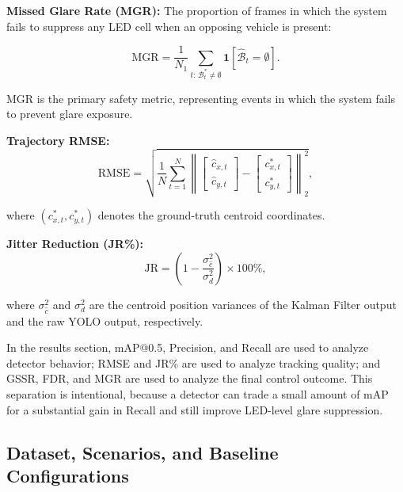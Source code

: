 \documentclass[pdflatex,sn-mathphys-num]{sn-jnl}%
\theoremstyle{thmstyleone}%
\theoremstyle{thmstyletwo}%
\theoremstyle{thmstylethree}%
\begin{document}
\medskip
\noindent\textbf{Missed Glare Rate (MGR):}
The proportion of frames in which the system fails to suppress any LED
cell when an opposing vehicle is present:

\begin{equation}
\mathrm{MGR} = \frac{1}{N_1}
\sum_{t:\, \mathcal{B}^{*}_t \neq \emptyset}
\mathbf{1}\!\left[\hat{\mathcal{B}}_t = \emptyset\right].
\label{eq:mgr}
\end{equation}

MGR is the primary safety metric, representing events in which the
system fails to prevent glare exposure.

\medskip
\noindent\textbf{Trajectory RMSE:}
\begin{equation}
\mathrm{RMSE} = \sqrt{
  \frac{1}{N} \sum_{t=1}^{N}
  \left\|
    \begin{bmatrix}\hat{c}_{x,t} \\ \hat{c}_{y,t}\end{bmatrix}
    -
    \begin{bmatrix}c^{*}_{x,t} \\ c^{*}_{y,t}\end{bmatrix}
  \right\|_2^2
},
\label{eq:rmse}
\end{equation}

\noindent where $(c^{*}_{x,t}, c^{*}_{y,t})$ denotes the
ground-truth centroid coordinates. ~\cite{Bishop2006}

\medskip
\noindent\textbf{Jitter Reduction (JR\%):}
\begin{equation}
\mathrm{JR} = \left(1 -
  \frac{\sigma_{\hat{c}}^2}{\sigma_{d}^2}
\right) \times 100\%,
\label{eq:jitter}
\end{equation}

\noindent where $\sigma_{\hat{c}}^2$ and $\sigma_{d}^2$ are the
centroid position variances of the Kalman Filter output and the raw
YOLO output, respectively.

\medskip
In the results section, mAP@0.5, Precision, and Recall are used to
analyze detector behavior; RMSE and JR\% are used to analyze tracking
quality; and GSSR, FDR, and MGR are used to analyze the final control
outcome. This separation is intentional, because a detector can trade a
small amount of mAP for a substantial gain in Recall and still improve
LED-level glare suppression.

\subsection{Dataset, Scenarios, and Baseline Configurations}
\label{subsec:eval_data_baseline}
\end{document}
